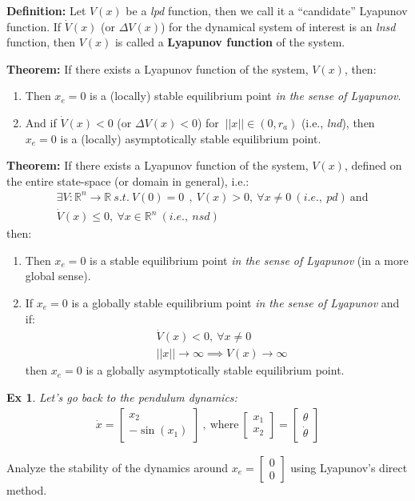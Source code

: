 \documentclass[twoside, 11pt]{article}
\newtheorem{exmp}[theorem]{Ex}
\begin{document}
\textbf{Definition:} Let $V(x)$ be a \textit{lpd} function, then we call it a ``candidate'' Lyapunov function. 
If $\dot{V}(x)$ (or $\Delta V(x)$) for the dynamical system of interest is an \textit{lnsd} function, then 
$V(x)$ is called a \textbf{Lyapunov function} of the system.

\textbf{Theorem:} If there exists a Lyapunov function of the system, $V(x)$, then:
\begin{enumerate}
    \item Then $x_e = 0$ is a (locally) stable equilibrium point \textit{in the sense of Lyapunov}.
    \item And if $\dot{V}(x) < 0$ (or $\Delta V(x) < 0$) for $\ || x || \in (0 , r_a)$ (i.e., \textit{lnd}), then 
    $x_e = 0$ is a (locally) asymptotically stable equilibrium point.
\end{enumerate}

\textbf{Theorem:} If there exists a Lyapunov function of the system, $V(x)$, defined on the entire state-space (or domain in general), i.e.:
\begin{align*}
    &\exists V: \mathbb{R}^n \to \mathbb{R} \ s.t. \ V(0) = 0 \ 
    \ , \
    V(x) > 0, \ \forall x \neq 0 \ (i.e., \ pd) \ \mathrm{and}
    \\
    &\dot{V}(x) \leq 0, \ \forall x \in \mathbb{R}^n \ (i.e., \ nsd)
\end{align*}
then:
\begin{enumerate}
    \item Then $x_e = 0$ is a stable equilibrium point \textit{in the sense of Lyapunov} (in a more global sense).
%    
    \item If $x_e = 0$ is a globally stable equilibrium point \textit{in the sense of Lyapunov} and if:
    \begin{align*}
    &\dot{V}(x) < 0, \ \forall x \neq 0
    \\
    &|| x || \to \infty \implies V(x) \to \infty 
\end{align*}
then $x_e = 0$ is a globally asymptotically stable equilibrium point.
\end{enumerate}

\begin{exmp}
    Let's go back to the pendulum dynamics:
    \begin{align*}
    \dot{x} = \begin{bmatrix} x_2 \\ -\sin(x_1)\end{bmatrix} \ , \ \mathrm{where} \ \begin{bmatrix} x_1 \\ x_2 \end{bmatrix} = \begin{bmatrix}  \theta \\ \dot{\theta} \end{bmatrix}
\end{align*}
\end{exmp}
Analyze the stability of the dynamics around $x_e = \begin{bmatrix} 0 \\ 0 \end{bmatrix}$ using Lyapunov's direct method.
\end{document}
